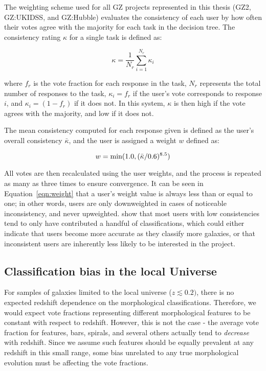 The weighting scheme used for all GZ projects represented in this thesis (GZ2, GZ:UKIDSS, and GZ:Hubble) evaluates the consistency of each user by how often their votes agree with the majority for each task in the decision tree. The consistency rating $\kappa$ for a single task is defined as:

\begin{equation}
\kappa = \frac{1}{N_{r}}\sum_{i=1}^{N_{r}}{\kappa_{i}}
\label{eqn:kappa}
\end{equation}

where $f_{r}$ is the vote fraction for each response in the task, $N_{r}$ represents the total number of responses to the task, $\kappa_{i} = f_{r}$ if the user's vote corresponds to response $i$, and $\kappa_{i} = (1-f_{r})$ if it does not. In this system, $\kappa$ is then high if the vote agrees with the majority, and low if it does not. 

The mean consistency computed for each response given is defined as the user's overall consistency $\bar{\kappa}$, and the user is assigned a weight $w$ defined as:

\begin{equation}
w = \rm min (1.0,(\bar{\kappa}/0.6)^{8.5})
\label{eqn:weight}
\end{equation}

All votes are then recalculated using the user weights, and the process is repeated as many as three times to ensure convergence. It can be seen in Equation~\ref{eqn:weight} that a user's weight value is always less than or equal to one; in other words, users are only downweighted in cases of noticeable inconsistency, and never upweighted. \citet{Willett2013} show that most users with low consistencies tend to only have contributed a handful of classifications, which could either indicate that users become more accurate as they classify more galaxies, or that inconsistent users are inherently less likely to be interested in the project. 

 
\subsection{Classification bias in the local Universe}

For samples of galaxies limited to the local universe ($z\lesssim0.2)$, there is no expected redshift dependence on the morphological classifications. Therefore, we would expect vote fractions representing different morphological features to be constant with respect to redshift. However, this is not the case - the average vote fraction for features, bars, spirals, and several others actually tend to \emph{decrease} with redshift. Since we assume such features should be equally prevalent at any redshift in this small range, some bias unrelated to any true morphological evolution must be affecting the vote fractions. 

